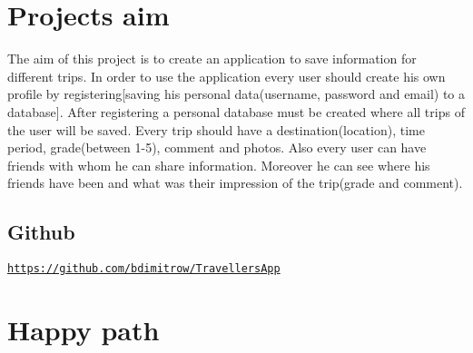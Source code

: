\hypertarget{index_First}{}\section{Project\textquotesingle{}s aim}\label{index_First}
The aim of this project is to create an application to save information for different trips. In order to use the application every user should create his own profile by registering\mbox{[}saving his personal data(username, password and email) to a database\mbox{]}. After registering a personal database must be created where all trips of the user will be saved. Every trip should have a destination(location), time period, grade(between 1-\/5), comment and photos. Also every user can have friends with whom he can share information. Moreover he can see where his friends have been and what was their impression of the trip(grade and comment).\hypertarget{index_Github}{}\subsection{Github}\label{index_Github}
\href{https://github.com/bdimitrow/TravellersApp}{\tt https\+://github.\+com/bdimitrow/\+Travellers\+App}\hypertarget{index_Second}{}\section{Happy path}\label{index_Second}

